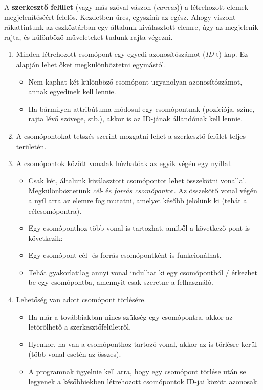 A \textbf{szerkesztő felület} (vagy más szóval vászon (\textit{canvas})) a létrehozott elemek megjelenítéséért felelős. Kezdetben üres, egyszínű az egész. Ahogy viszont rákattintunk az eszköztárban egy általunk kiválasztott elemre, úgy az megjelenik rajta, és különböző műveleteket tudunk rajta végezni.

\begin{enumerate}
\item Minden létrehozott csomópont egy egyedi azonosítószámot (\textit{ID}-t) kap. Ez alapján lehet őket megkülönböztetni egymástól.

\begin{itemize}
\item Nem kaphat két különböző csomópont ugyanolyan azonosítószámot, annak egyedinek kell lennie.
\item Ha bármilyen attribútuma módosul egy csomópontnak (pozíciója, színe, rajta lévő szövege, stb.), akkor is az ID-jának állandónak kell lennie.
\end{itemize}

\item A csomópontokat tetszés szerint mozgatni lehet a szerkesztő felület teljes területén.

\item A csomópontok között vonalak húzhatóak az egyik végén egy nyíllal.

\begin{itemize}
\item Csak két, általunk kiválasztott csomópontot lehet összekötni vonallal. Megkülönböztetünk \textit{cél}- és \textit{forrás csomópont}ot. Az összekötő vonal végén a nyíl arra az elemre fog mutatni, amelyet később jelölünk ki (tehát a célcsomópontra).
\item Egy csomóponthoz több vonal is tartozhat, amiből a következő pont is következik:
\item Egy csomópont cél- és forrás csomópontként is funkcionálhat.
\item Tehát gyakorlatilag annyi vonal indulhat ki egy csomópontból / érkezhet be egy csomópontba, amennyit csak szeretne a felhasználó.
\end{itemize}

\item Lehetőség van adott csomópont törlésére.

\begin{itemize}
\item Ha már a továbbiakban nincs szükség egy csomópontra, akkor az letörölhető a szerkesztőfelületről.
\item Ilyenkor, ha van a csomóponthoz tartozó vonal, akkor az is törlésre kerül (több vonal esetén az összes).
\item A programnak ügyelnie kell arra, hogy egy csomópont törlése után se legyenek a későbbiekben létrehozott csomópontok ID-jai között azonosak.
\end{itemize}

\end{enumerate}

